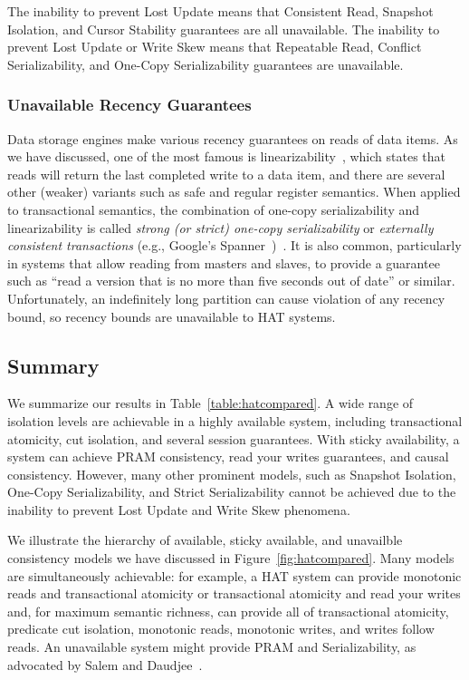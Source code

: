 The inability to prevent Lost Update means that Consistent Read,
Snapshot Isolation, and Cursor Stability guarantees are all
unavailable. The inability to prevent Lost Update or Write Skew means
that Repeatable Read, Conflict Serializability, and One-Copy
Serializability guarantees are unavailable.

\subsubsection{Unavailable Recency Guarantees}

Data storage engines make various recency guarantees on reads of data
items. As we have discussed, one of the most famous is
linearizability~\cite{herlihy-art}, which states that reads will
return the last completed write to a data item, and there are several
other (weaker) variants such as safe and regular register
semantics. When applied to transactional semantics, the combination of
one-copy serializability and linearizability is called \textit{strong
  (or strict) one-copy serializability} or \textit{externally
  consistent transactions} (e.g., Google's
Spanner~\cite{spanner})~\cite{adya}. It is also common, particularly
in systems that allow reading from masters and slaves, to provide a
guarantee such as ``read a version that is no more than five seconds
out of date'' or similar. Unfortunately, an indefinitely long
partition can cause violation of any recency bound, so recency bounds
are unavailable to HAT systems.

\subsection{Summary}
\label{sec:hat-summary}

We summarize our results in Table~\ref{table:hatcompared}. A wide
range of isolation levels are achievable in a highly available system,
including transactional atomicity, cut isolation, and several session
guarantees. With sticky availability, a system can achieve PRAM
consistency, read your writes guarantees, and causal
consistency. However, many other prominent models, such as Snapshot
Isolation, One-Copy Serializability, and Strict Serializability cannot
be achieved due to the inability to prevent Lost Update and Write Skew phenomena.

We illustrate the hierarchy of available, sticky available, and
unavailble consistency models we have discussed in
Figure~\ref{fig:hatcompared}. Many models are simultaneously
achievable: for example, a HAT system can provide monotonic reads and
transactional atomicity or transactional atomicity and read your
writes and, for maximum semantic richness, can provide all of
transactional atomicity, predicate cut isolation, monotonic reads,
monotonic writes, and writes follow reads. An unavailable system might
provide PRAM and Serializability, as advocated by Salem and
Daudjee~\cite{daudjee-session}.

